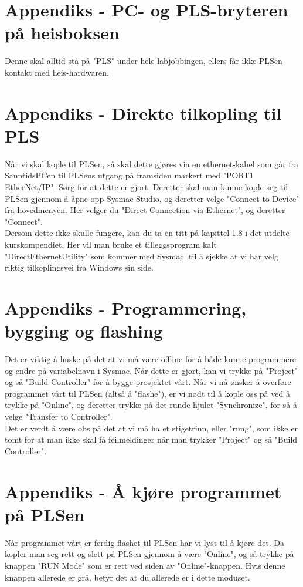 \appendix
\section{Appendiks - PC- og PLS-bryteren på heisboksen}
Denne skal alltid stå på "PLS" under hele labjobbingen, ellers får ikke PLSen kontakt med heis-hardwaren.

\section{Appendiks - Direkte tilkopling til PLS}
Når vi skal kople til PLSen, så skal dette gjøres via en ethernet-kabel som går fra SanntidsPCen til PLSens utgang på framsiden markert med "PORT1 EtherNet/IP". Sørg for at dette er gjort. Deretter skal man kunne kople seg til PLSen gjennom å åpne opp Sysmac Studio, og deretter velge "Connect to Device" fra hovedmenyen.  Her velger du "Direct Connection via Ethernet", og deretter "Connect".\\

Dersom dette ikke skulle fungere, kan du ta en titt på kapittel 1.8 i det utdelte kurskompendiet. Her vil man bruke et tilleggsprogram kalt "DirectEthernetUtility" som kommer med Sysmac, til å sjekke at vi har velg riktig tilkoplingsvei fra Windows sin side.

\section{Appendiks - Programmering, bygging og flashing}
Det er viktig å huske på det at vi må være offline for å både kunne programmere og endre på variabelnavn i Sysmac. Når dette er gjort, kan vi trykke på "Project" og så "Build Controller" for å bygge prosjektet vårt. Når vi nå ønsker å overføre programmet vårt til PLSen (altså å "flashe"), er vi nødt til å kople oss på ved å trykke på "Online", og deretter trykke på det runde hjulet "Synchronize", for så å velge "Transfer to Controller".\\

Det er verdt å være obs på det at vi må ha et stigetrinn, eller "rung", som ikke er tomt for at man ikke skal få feilmeldinger når man trykker "Project" og så "Build Controller".\\

\section{Appendiks - Å kjøre programmet på PLSen}
Når programmet vårt er ferdig flashet til PLSen har vi lyst til å kjøre det. Da kopler man seg rett og slett på PLSen gjennom å være "Online", og så trykke på knappen "RUN Mode" som er rett ved siden av "Online"-knappen. Hvis denne knappen allerede er grå, betyr det at du allerede er i dette moduset.

